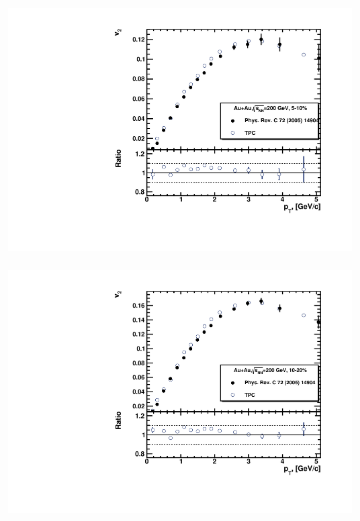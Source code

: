 \begin{figure}[ht]
    \begin{subfigure}{.49\textwidth}
        \centering
        \includegraphics[width=1.\linewidth]{Figures/v2_charged_hadrons_pt_cent1.pdf}
    \end{subfigure}
    \begin{subfigure}{.49\textwidth}
        \centering
        \includegraphics[width=1.\linewidth]{Figures/v2_charged_hadrons_pt_cent2.pdf}
    \end{subfigure}
    \\
    \begin{subfigure}{.49\textwidth}
        \centering

\end{subfigure}
\end{figure}
